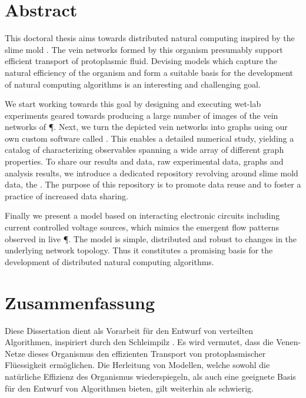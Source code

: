 \null\vfill

\section*{Abstract}
	
	This doctoral thesis aims towards distributed natural computing inspired by the slime mold \Pp. The vein networks formed by this organism presumably support efficient transport of protoplasmic fluid. Devising models which capture the natural efficiency of the organism and form a suitable basis for the development of natural computing algorithms is an interesting and challenging goal.
	
	We start working towards this goal by designing and executing wet-lab experiments geared towards producing a large number of images of the vein networks of \P. Next, we turn the depicted vein networks into graphs using our own custom software called \NEFI. This enables a detailed numerical study, yielding a catalog of characterizing observables spanning a wide array of different graph properties. To share our results and data, \ie raw experimental data, graphs and analysis results, we introduce a dedicated repository revolving around slime mold data, the \SMGR. The purpose of this repository is to promote data reuse and to foster a practice of increased data sharing. 

	Finally we present a model based on interacting electronic circuits including current controlled voltage sources, which mimics the emergent flow patterns observed in live \P. The model is simple, distributed and robust to changes in the underlying network topology. Thus it constitutes a promising basis for the development of distributed natural computing algorithms.

\null\vfill

\section*{Zusammenfassung}

	Diese Dissertation dient als Vorarbeit f\"ur den Entwurf von verteilten Algorithmen, inspiriert durch den Schleimpilz \Pp. Es wird vermutet, dass die Venen-Netze dieses Organismus den effizienten Transport von protoplasmischer Fl\"uessigkeit erm\"oglichen. Die Herleitung von Modellen, welche sowohl die nat\"urliche Effizienz des Organismus wiederspiegeln, als auch eine geeignete Basis f\"ur den Entwurf von Algorithmen bieten, gilt weiterhin als schwierig.

